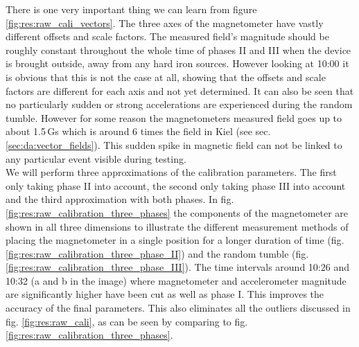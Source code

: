 There is one very important thing we can learn from figure \ref{fig:res:raw_cali_vectors}. The three axes of the magnetometer have vastly different offsets and scale factors. The measured field's magnitude should be roughly constant throughout the whole time of phases II and III when the device is brought outside, away from any hard iron sources. However looking at 10:00 it is obvious that this is not the case at all, showing that the offsets and scale factors are different for each axis and not yet determined. It can also be seen that no particularly sudden or strong accelerations are experienced during the random tumble. However for some reason the magnetometers measured field goes up to about 1.5\,Gs which is around 6 times the field in Kiel (see sec. \ref{sec:da:vector_fields}). This sudden spike in magnetic field can not be linked to any particular event visible during testing. \\
We will perform three approximations of the calibration parameters. The first only taking phase II into account, the second only taking phase III into account and the third approximation with both phases. In fig. \ref{fig:res:raw_calibration_three_phases} the components of the magnetometer are shown in all three dimensions to illustrate the different measurement methods of placing the magnetometer in a single position for a longer duration of time (fig. \ref{fig:res:raw_calibration_three_phase_II}) and the random tumble (fig. \ref{fig:res:raw_calibration_three_phase_III}). The time intervals around 10:26 and 10:32 (a and b in the image) where magnetometer and accelerometer magnitude are significantly higher have been cut as well as phase I. This improves the accuracy of the final parameters. This also eliminates all the outliers discussed in fig. \ref{fig:res:raw_cali}, as can be seen by comparing to fig. \ref{fig:res:raw_calibration_three_phases}.

